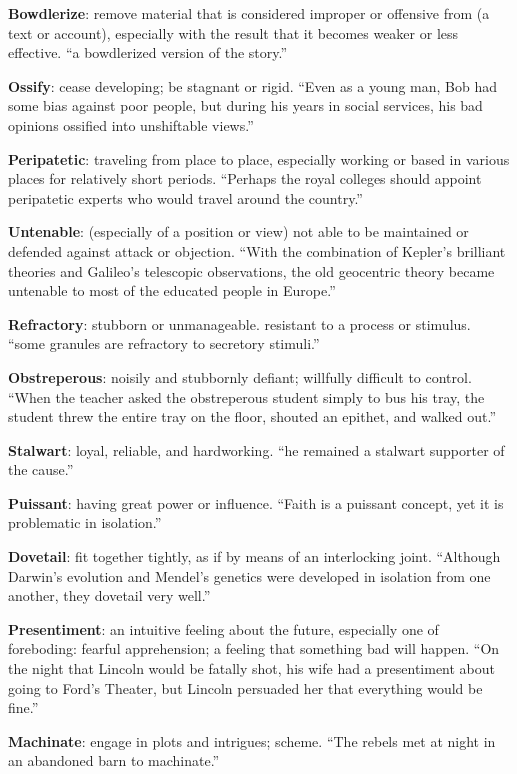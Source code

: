 \documentclass[12pt, a4paper]{ximera}
\begin{document}
\textbf{Bowdlerize}: remove material that is considered improper or offensive from (a text or account), especially with the result that it becomes weaker or less effective. ``a bowdlerized version of the story.''

\textbf{Ossify}: cease developing; be stagnant or rigid. ``Even as a young man, Bob had some bias against poor people, but during his years in social services, his bad opinions ossified into unshiftable views.''

\textbf{Peripatetic}: traveling from place to place, especially working or based in various places for relatively short periods. ``Perhaps the royal colleges should appoint peripatetic experts who would travel around the country.''

\textbf{Untenable}: (especially of a position or view) not able to be maintained or defended against attack or objection. ``With the combination of Kepler's brilliant theories and Galileo's telescopic observations, the old geocentric theory became untenable to most of the educated people in Europe.''

\textbf{Refractory}: stubborn or unmanageable. resistant to a process or stimulus. ``some granules are refractory to secretory stimuli.''

\textbf{Obstreperous}: noisily and stubbornly defiant; willfully difficult to control. ``When the teacher asked the obstreperous student simply to bus his tray, the student threw the entire tray on the floor, shouted an epithet, and walked out.''

\textbf{Stalwart}: loyal, reliable, and hardworking. ``he remained a stalwart supporter of the cause.''

\textbf{Puissant}: having great power or influence. ``Faith is a puissant concept, yet it is problematic in isolation.''

\textbf{Dovetail}: fit together tightly, as if by means of an interlocking joint. ``Although Darwin's evolution and Mendel's genetics were developed in isolation from one another, they dovetail very well.''

\textbf{Presentiment}: an intuitive feeling about the future, especially one of foreboding: fearful apprehension; a feeling that something bad will happen. ``On the night that Lincoln would be fatally shot, his wife had a presentiment about going to Ford's Theater, but Lincoln persuaded her that everything would be fine.''

\textbf{Machinate}: engage in plots and intrigues; scheme. ``The rebels met at night in an abandoned barn to machinate.''
\end{document}
